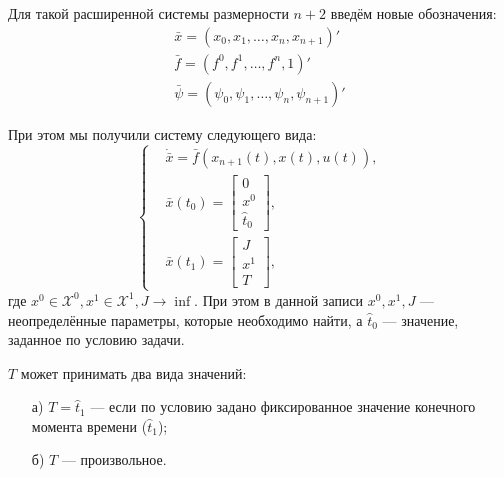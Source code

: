 Для такой расширенной системы размерности $n+2$ введём новые обозначения:
$$
\begin{matrix}
\bar{x} = (x_0, x_1, \ldots, x_n, x_{n+1})' \\
\bar{f} = (f^0, f^1, \ldots, f^n, 1)' \\
\bar{\psi} = (\psi_0, \psi_1, \ldots, \psi_n, \psi_{n+1})'
\end{matrix}
$$

При этом мы получили систему следующего вида:
$$
\left\{
    \begin{aligned}
        & \dot{\bar{x}} = \bar{f}(x_{n+1}(t), x(t), u(t)), \\
        & \bar{x}(t_0) = \begin{bmatrix} 0 \\ x^0 \\ \hat{t}_0 \end{bmatrix}, \\
        & \bar{x}(t_1) = \begin{bmatrix} J \\ x^1 \\ T \end{bmatrix},
    \end{aligned}
\right.
$$
где $x^0 \in \mathscr{X}^0, x^1 \in \mathscr{X}^1, J \to \inf$. При этом в данной записи $x^0, x^1, J$ --- неопределённые параметры, которые необходимо найти, а $\hat{t}_0$ --- значение, заданное по условию задачи.

$T$ может принимать два вида значений:
\begin{itemize}
    \item[а)] $T = \hat{t}_1$ --- если по условию задано фиксированное значение конечного момента времени ($\hat{t}_1$);
    \item[б)] $T$ --- произвольное.
\end{itemize}

